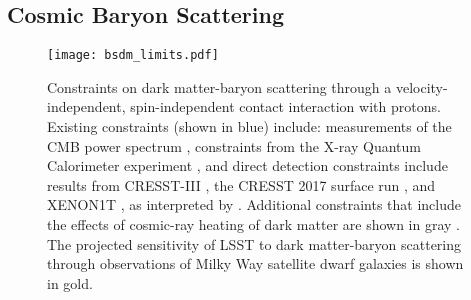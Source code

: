 \begin{comment}
Another interesting aspect is the ability to reconstruct of more recent mergers. Using the second data release of Gaia, a new merger called the Gaia Sausage or the Gaia Enceleadus \citep{2018MNRAS.477.1472B,2018Natur.563...85H} has been found. Using the correlation observed in simulations, \cite{necib2018} extracted the new velocity distribution of DM brought in by the same merger, and studied its implications in current direct detection experiments. 

In order to do obtain the full empirical distribution of DM, one needs the 3-d velocities of the stars in the local neighborhood. Gaia provides proper motion and parallaxes for stars down to 20th magnitude. LSST will be able to extend this dataset to fainter stars, giving us a more accurate measurement of proper motions of stars in the solar neighborhood and beyond.

 Using proper motions of stars from LSST, coupled with radial velocity measurements from future telescopes like MSE, we will be able to obtain the most accurate 3-d velocity measurements of the local stars, and subsequently use this information to obtain a full empirical measurement of DM. Such detailed analysis will unveil new structures much smaller than the Gaia Sausage, but with equal importance in DM direct detection if it passes by the Solar neighborhood.
\end{comment}

\subsection{Cosmic Baryon Scattering }

\begin{figure}
\centering
\texttt{[image: bsdm\_limits.pdf]}
\caption{
Constraints on dark matter-baryon scattering through a velocity-independent, spin-independent contact interaction with protons. 
Existing constraints (shown in blue) include: measurements of the CMB power spectrum \citep[CMB;][]{Gluscevic:2017ywp}, constraints from the X-ray Quantum Calorimeter experiment \citep[XQC;][]{0704.0794}, and direct detection constraints include results from CRESST-III \citep{1711.07692}, the CRESST 2017 surface run \citep{1707.06749}, and XENON1T \citep{1705.06655}, as interpreted by \citet[][]{1802.04764}. %
Additional constraints that include the effects of cosmic-ray heating of dark matter are shown in gray \citep[][]{1810.10543}.
The projected sensitivity of LSST to dark matter-baryon scattering through observations of Milky Way satellite dwarf galaxies is shown in gold.
}
\label{fig:dd}
\end{figure}

